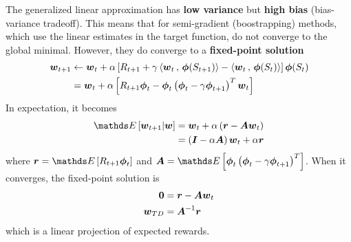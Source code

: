 \documentclass[11pt]{article}
\begin{document}
The generalized linear approximation has \textbf{low variance} but \textbf{high bias} (bias-variance tradeoff). This means that for semi-gradient (boostrapping) methods, which use the linear estimates in the target function, do not converge to the global minimal. However, they do converge to a \textbf{fixed-point solution} 
\begin{align}
\boldsymbol{w}_{t+1} &\leftarrow  \boldsymbol{w}_{t} + \alpha \left[R_{t+1} + \gamma  \left\langle  \boldsymbol{w}_{t}\,,\, \boldsymbol{\phi}(S_{t+1}) \right\rangle-  \left\langle  \boldsymbol{w}_{t}\,,\, \boldsymbol{\phi}(S_{t}) \right\rangle\right] \boldsymbol{\phi}(S_{t}) \label{eqn: linear_semi_grad_td} \\
&= \boldsymbol{w}_{t} + \alpha \left[R_{t+1}\boldsymbol{\phi}_{t} - \boldsymbol{\phi}_{t}\left(\boldsymbol{\phi}_{t} - \gamma \boldsymbol{\phi}_{t+1} \right)^{T}\boldsymbol{w}_{t} \right]\nonumber
\end{align} In expectation, it becomes
\begin{align*}
\E{}{\mb{w}_{t+1}|\mb{w}} &=\mb{w}_{t} + \alpha \paren{\mb{r} - \mb{A}\mb{w}_{t}} \\
&=\paren{\mb{I} - \alpha\mb{A}} \mb{w}_{t} + \alpha \mb{r} 
\end{align*} where $\mb{r} = \E{}{R_{t+1}\mb{\phi}_{t}}$ and $\mb{A} = \E{}{\mb{\phi}_{t}\paren{\mb{\phi}_{t} - \gamma \mb{\phi}_{t+1} }^{T}}$. When it converges, the fixed-point solution is
\begin{align*}
\boldsymbol{0}&= \boldsymbol{r} - \boldsymbol{A}\boldsymbol{w}_{t} \\
\boldsymbol{w}_{TD} &=  \boldsymbol{A}^{-1}\boldsymbol{r}
\end{align*} which is a linear projection of expected rewards.
\end{document}
